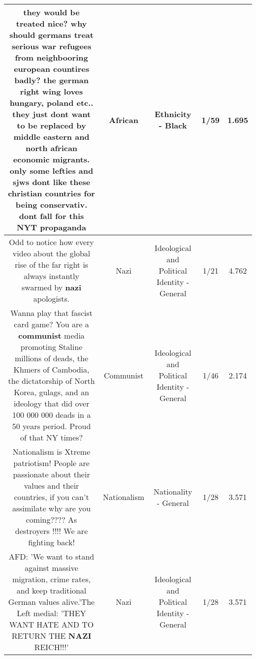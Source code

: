\documentclass[11pt]{article}
\newlength\mylength
\begin{document}
\begin{center}
\begin{longtable}{|C{.65\mylength}|C{.30\mylength}|C{.12\mylength}|C{.12\mylength}|C{.12\mylength}|}
  \small they would be treated nice? why should germans treat serious war refugees from neighbooring european countires badly? the german right wing loves hungary, poland etc.. they just dont want to be replaced by middle eastern and north \textbf{african} economic migrants. only some lefties and sjws dont like these christian countries for being conservativ. dont fall for this NYT propaganda\normalsize   & African & Ethnicity - Black & 1/59 & 1.695 \\  \hline
  \small Odd to notice how every video about the global rise of the far right is always instantly swarmed by \textbf{nazi} apologists.\normalsize   & Nazi &  Ideological and Political Identity - General & 1/21 & 4.762 \\  \hline
  \small Wanna play that fascist card game? You are a \textbf{communist} media promoting Staline millions of deads, the Khmers of Cambodia, the dictatorship of North Korea, gulags, and an ideology that did over 100 000 000 deads in a 50 years period. Proud of that NY times?\normalsize   & Communist &  Ideological and Political Identity - General & 1/46 & 2.174 \\  \hline
  \small Nationalism is Xtreme patriotism! People are passionate about their values and their countries, if you can't assimilate why are you coming???? As destroyers !!!! We are fighting back!\normalsize   & Nationalism & Nationality - General & 1/28 & 3.571 \\  \hline
  \small AFD: 'We want to stand against massive migration, crime rates, and keep traditional German values alive.'The Left medial: 'THEY WANT HATE AND TO RETURN THE \textbf{NAZI} REICH!!!'\normalsize   & Nazi &  Ideological and Political Identity - General & 1/28 & 3.571 \\  \hline

\end{longtable}
\end{center}
\end{document}

